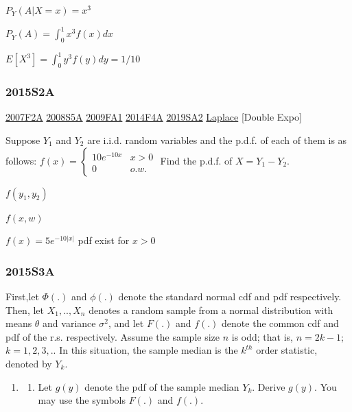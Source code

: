 \documentclass[10pt,twocolumn,portrait]{article}
\providecommand{\tightlist}{%
  \setlength{\itemsep}{0pt}\setlength{\parskip}{0pt}}
\begin{document}
\(P_Y(A|X=x)=x^3\)

\(P_Y(A)=\int_0^1x^3f(x)dx\)

\(E[X^3]=\int_0^1y^3f(y)dy=1/10\)

\hypertarget{s2a-1}{%
\subsubsection{2015S2A}\label{s2a-1}}

\protect\hyperlink{f2a}{2007F2A} \protect\hyperlink{s5a}{2008S5A}
\protect\hyperlink{fa1}{2009FA1} \protect\hyperlink{f4a-1}{2014F4A}
\protect\hyperlink{sa2-3}{2019SA2} \protect\hyperlink{Laplace}{Laplace}
{[}Double Expo{]}

Suppose \(Y_1\) and \(Y_2\) are i.i.d. random variables and the p.d.f.
of each of them is as follows:
\(f(x)=\begin{cases}10e^{-10x}& x>0\\0& o.w.\end{cases}\) Find the
p.d.f. of \(X=Y_1-Y_2\).

\(f(y_1,y_2)\)

\(f(x,w)\)

\(f(x)=5e^{-10|x|}\) pdf exist for \(x>0\)

\hypertarget{s3a-1}{%
\subsubsection{2015S3A}\label{s3a-1}}

First,let \(\Phi(.)\) and \(\phi(.)\) denote the standard normal cdf and
pdf respectively. Then, let \(X_1,..,X_n\) denotes a random sample from
a normal distribution with means \(\theta\) and variance \(\sigma^2\),
and let \(F(.)\) and \(f(.)\) denote the common cdf and pdf of the r.s.
respectively. Assume the sample size \(n\) is odd; that is, \(n=2k-1\);
\(k=1,2,3,..\) In this situation, the sample median is the \(k^{th}\)
order statistic, denoted by \(Y_k\).

\begin{enumerate}
\def\labelenumi{(\alph{enumi})}
\item
  \begin{enumerate}
  \def\labelenumii{(\arabic{enumii})}
  \setcounter{enumii}{4}
  \tightlist
  \item
    Let \(g(y)\) denote the pdf of the sample median \(Y_k\). Derive
    \(g(y)\). You may use the symbols \(F(.)\) and \(f(.)\).
  \end{enumerate}
\end{enumerate}
\end{document}
